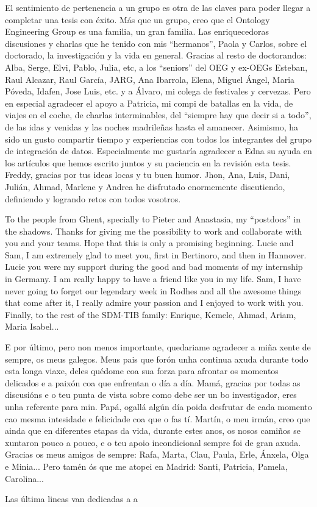 \begin{acknowledgementslong}
El sentimiento de pertenencia a un grupo es otra de las claves para poder llegar a completar una tesis con éxito. Más que un grupo, creo que el Ontology Engineering Group es una familia, un gran familia. Las enriquecedoras discusiones y charlas que he tenido con mis ``hermanos'', Paola y Carlos, sobre el doctorado, la investigación y la vida en general. Gracias al resto de doctorandos: Alba, Serge, Elvi, Pablo, Julia, etc, a los ``seniors'' del OEG y ex-OEGs Esteban, Raul Alcazar, Raul García, JARG, Ana Ibarrola, Elena, Miguel Ángel, Maria Póveda, Idafen, Jose Luis, etc. y a Álvaro, mi colega de festivales y cervezas. Pero en especial agradecer el apoyo a Patricia, mi compi de batallas en la vida, de viajes en el coche, de charlas interminables, del ``siempre hay que decir si a todo'', de las idas y venidas y las noches madrileñas hasta el amanecer. Asimismo, ha sido un gusto compartir tiempo y experiencias con todos los integrantes del grupo de integración de datos. Especialmente me gustaría agradecer a Edna su ayuda en los artículos que hemos escrito juntos y su paciencia en la revisión esta tesis. Freddy, gracias por tus ideas locas y tu buen humor. Jhon, Ana, Luis, Dani, Julián, Ahmad, Marlene y Andrea he disfrutado enormemente discutiendo, definiendo y logrando retos con todos vosotros. 

To the people from Ghent, specially to Pieter and Anastasia, my ``postdocs'' in the shadows. Thanks for giving me the possibility to work and collaborate with you and your teams. Hope that this is only a promising beginning. Lucie and Sam, I am extremely glad to meet you, first in Bertinoro, and then in Hannover. Lucie you were my support during the good and bad moments of my internship in Germany. I am really happy to have a friend like you in my life. Sam, I have never going to forget our legendary week in Rodhes and all the awesome things that come after it, I really admire your passion and I enjoyed to work with you. Finally, to the rest of the SDM-TIB family: Enrique, Kemele, Ahmad, Ariam, Maria Isabel...

E por último, pero non menos importante, quedariame agradecer a miña xente de sempre, os meus galegos. Meus pais que forón unha continua axuda durante todo esta longa viaxe, deles quédome coa sua forza para afrontar os momentos delicados e a paixón coa que enfrentan o día a día. Mamá, gracias por todas as discusións e o teu punta de vista sobre como debe ser un bo investigador, eres unha referente para min. Papá, ogallá algún día poida desfrutar de cada momento cao mesma intesidade e felicidade coa que o fas tí. Martín, o meu irmán, creo que ainda que en diferentes etapas da vida, durante estes anos, os nosos camiños se xuntaron pouco a pouco, e o teu apoio incondicional sempre foi de gran axuda. Gracias os meus amigos de sempre: Rafa, Marta, Clau, Paula, Erle, Ánxela, Olga e Minia... Pero tamén ós que me atopei en Madrid: Santi, Patricia, Pamela, Carolina...

Las última lineas van dedicadas a a




\end{acknowledgementslong}




